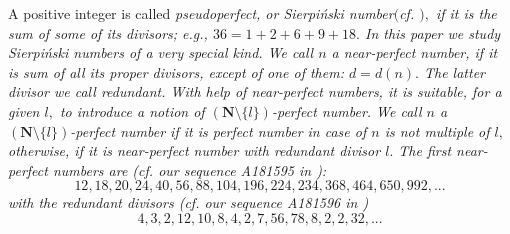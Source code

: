 \documentclass[12pt]{amsart}
\numberwithin{equation}{section}
\begin{document}
\indent A positive integer is called \slshape pseudoperfect, \upshape or \slshape Sierpi\'{n}ski number\slshape \enskip $($cf. \cite{3}$),$ if it is the sum of \slshape some \upshape of its divisors; e.g., $36=1+2+6+9+18.$ In this paper we study Sierpi\'{n}ski numbers of a very special kind. We call $n$ a \slshape near-perfect \upshape number, if it is sum of all its proper divisors, except of \slshape one \upshape of them: $d=d(n).$ The latter divisor we call \slshape redundant. \upshape With help of near-perfect numbers, it is suitable, for a given $l,$ to introduce a notion of $(\mathbf{N}\setminus\{l\})$-perfect number. We call $n$ a $(\mathbf{N}\setminus\{l\})$-perfect number if it is perfect number in case of $n$ is not multiple of $l,$  otherwise, if it is near-perfect number with redundant divisor $l.$\newline
The first near-perfect numbers are (cf. our sequence A181595 in \cite{4}):
\begin{equation}\label{1.2}
12, 18, 20, 24, 40, 56, 88, 104, 196, 224, 234, 368, 464, 650, 992,...
\end{equation}
with the redundant divisors (cf. our sequence A181596 in \cite{4})
\begin{equation}\label{1.3}
 4,  3,  2, 12, 10,  8,  4,   2,   7,  56,  78,   8,   2,   2,  32,...
\end{equation}
\end{document}
